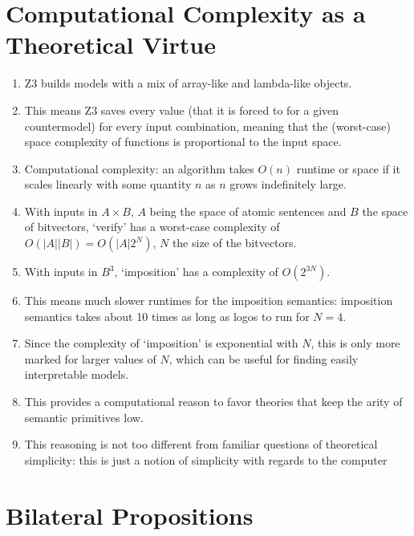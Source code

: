 \documentclass[a4paper, 11pt]{article} %
\theoremstyle{Pthm}
\newcommand{\abs}[1]{|#1|} %
\begin{document}
\section*{Computational Complexity as a Theoretical Virtue}%

\begin{enumerate}[leftmargin=.25in]
	\item Z3 builds models with a mix of array-like and lambda-like objects.
	\item This means Z3 saves every value (that it is forced to for a given countermodel) for every input combination, meaning that the (worst-case) space complexity of functions is proportional to the input space. 
	\item Computational complexity: an algorithm takes $O(n)$ runtime or space if it scales linearly with some quantity $n$ as $n$ grows indefinitely large. 
	\item With inputs in $A \times B$, $A$ being the space of atomic sentences and $B$ the space of bitvectors, `verify' has a worst-case complexity of $O(\abs{A} \abs{B}) = O(\abs{A} 2^N)$, $N$ the size of the bitvectors.
	\item With inputs in $B^3$, `imposition' has a complexity of $O(2^{3N})$. 
	\item This means much slower runtimes for the imposition semantics: imposition semantics takes about 10 times as long as logos to run for $N=4$. 
	\item Since the complexity of `imposition' is exponential with $N$, this is only more marked for larger values of $N$, which can be useful for finding easily interpretable models. 
	\item This provides a computational reason to favor theories that keep the arity of semantic primitives low.
	\item This reasoning is not too different from familiar questions of theoretical simplicity: this is just a notion of simplicity with regards to the computer
\end{enumerate}




\section*{Bilateral Propositions}%
\end{document}
